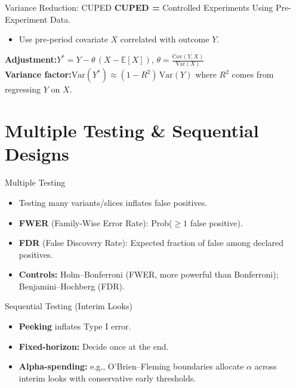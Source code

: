 \documentclass[aspectratio=169]{beamer}
\begin{document}
\begin{frame}{Variance Reduction: CUPED}
  \textbf{CUPED =} Controlled Experiments Using Pre-Experiment Data.
  \begin{itemize}
    \item Use pre-period covariate $X$ correlated with outcome $Y$.
  \end{itemize}
  \vspace{0.5em}
  \textbf{Adjustment:}\quad $Y^* = Y - \theta\,(X-\mathbb{E}[X])$, \quad $\theta=\frac{\mathrm{Cov}(Y,X)}{\mathrm{Var}(X)}$\\[0.5em]
  \textbf{Variance factor:}\quad $\mathrm{Var}(Y^*) \approx (1-R^2)\,\mathrm{Var}(Y)$ where $R^2$ comes from regressing $Y$ on $X$.
\end{frame}

\section{Multiple Testing \& Sequential Designs}
\begin{frame}{Multiple Testing}
  \begin{itemize}
    \item Testing many variants/slices inflates false positives.
    \item \textbf{FWER} (Family-Wise Error Rate): Prob($\geq1$ false positive).
    \item \textbf{FDR} (False Discovery Rate): Expected fraction of false among declared positives.
    \item \textbf{Controls:} Holm--Bonferroni (FWER, more powerful than Bonferroni); Benjamini--Hochberg (FDR).
  \end{itemize}
\end{frame}

\begin{frame}{Sequential Testing (Interim Looks)}
  \begin{itemize}
    \item \textbf{Peeking} inflates Type I error.
    \item \textbf{Fixed-horizon:} Decide once at the end.
    \item \textbf{Alpha-spending:} e.g., O'Brien--Fleming boundaries allocate $\alpha$ across interim looks with conservative early thresholds.
  \end{itemize}
\end{frame}
\end{document}
